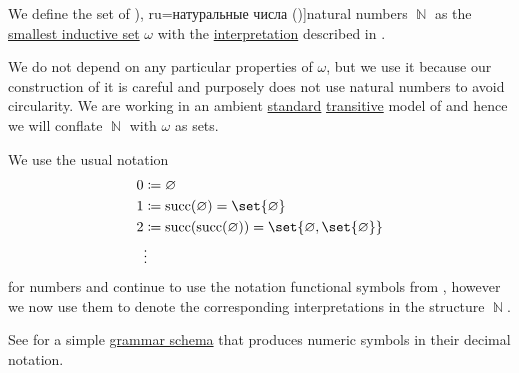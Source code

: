 \begin{definition}\label{def:natural_numbers}
  We define the set of \term[bg=естествени числа (\cite[371]{ГеновМиховскиМоллов1991}), ru=натуральные числа (\cite[aux I.4.1]{КолмогоровДрагалин2006})]{natural numbers} \( \BbbN \) as the \hyperref[thm:smallest_inductive_set_existence]{smallest inductive set} \( \omega \) with the \hyperref[def:first_order_structure/interpretation]{interpretation} described in .

  We do not depend on any particular properties of \( \omega \), but we use it because our construction of it is careful and purposely does not use natural numbers to avoid circularity. We are working in an ambient \hyperref[rem:standard_model_of_set_theory]{standard} \hyperref[rem:transitive_model_of_set_theory]{transitive} model of \hyperref[def:axiom_of_universes]{} and hence we will conflate \( \BbbN \) with \( \omega \) as sets.

  We use the usual notation
  \begin{align*}
    0 &\coloneqq \varnothing \\
    1 &\coloneqq \op{succ}(\varnothing) = \set{ \varnothing } \\
    2 &\coloneqq \op{succ}(\op{succ}(\varnothing)) = \set{ \varnothing, \set{ \varnothing } } \\
      &\vdots
  \end{align*}
  for numbers and continue to use the notation functional symbols from , however we now use them to denote the corresponding interpretations in the structure \( \BbbN \).
\end{definition}
\begin{comments}
  \item See  for a simple \hyperref[def:formal_grammar/schema]{grammar schema} that produces numeric symbols in their decimal notation.
\end{comments}

